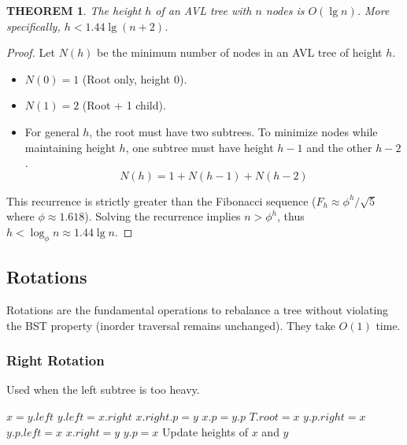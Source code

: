 \documentclass[12pt]{article}
\theoremstyle{blueplain}
\newtheorem{theorem}{THEOREM}[section]
\theoremstyle{bluedef}
\theoremstyle{blueremark}
\begin{document}
\begin{theorem}
    The height $h$ of an AVL tree with $n$ nodes is $O(\lg n)$. More specifically, $h < 1.44 \lg (n+2)$.
\end{theorem}
\begin{proof}
    Let $N(h)$ be the minimum number of nodes in an AVL tree of height $h$.
    \begin{itemize}
        \item $N(0) = 1$ (Root only, height 0).
        \item $N(1) = 2$ (Root + 1 child).
        \item For general $h$, the root must have two subtrees. To minimize nodes while maintaining height $h$, one subtree must have height $h-1$ and the other $h-2$.
              \[ N(h) = 1 + N(h-1) + N(h-2) \]
    \end{itemize}
    This recurrence is strictly greater than the Fibonacci sequence ($F_h \approx \phi^h / \sqrt{5}$ where $\phi \approx 1.618$).
    Solving the recurrence implies $n > \phi^h$, thus $h < \log_\phi n \approx 1.44 \lg n$.
\end{proof}

\subsection{Rotations}

Rotations are the fundamental operations to rebalance a tree without violating the BST property (inorder traversal remains unchanged). They take $O(1)$ time.

\subsubsection{Right Rotation}
Used when the left subtree is too heavy.
\begin{algorithm}
    \caption{Right Rotation}\label{alg:rightRotate}
    \begin{algorithmic}[1]
        \State $x = y.left$
        \State $y.left = x.right$ 
         $x.right.p = y$
        \EndIf
        \State $x.p = y.p$ 
         $T.root = x$
         $y.p.right = x$
        \Else \ $y.p.left = x$
        \EndIf
        \State $x.right = y$ 
        \State $y.p = x$
        \State Update heights of $x$ and $y$
        \EndProcedure
    \end{algorithmic}
\end{algorithm}
\end{document}
